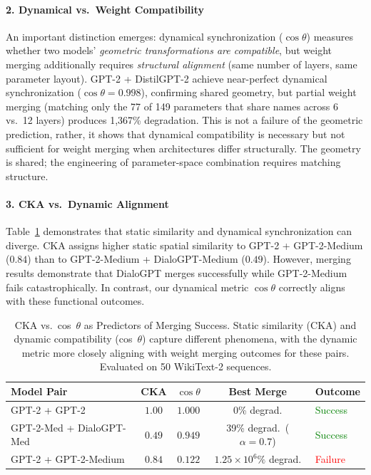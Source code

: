 \documentclass[10pt]{article} %
\theoremstyle{plain}
\theoremstyle{definition}
\theoremstyle{remark}
\begin{document}
\paragraph{2. Dynamical vs.\ Weight Compatibility}
An important distinction emerges: dynamical synchronization ($\cos \theta$) measures whether two models' \textit{geometric transformations are compatible}, but weight merging additionally requires \textit{structural alignment} (same number of layers, same parameter layout). GPT-2 + DistilGPT-2 achieve near-perfect dynamical synchronization ($\cos \theta = 0.998$), confirming shared geometry, but partial weight merging (matching only the 77 of 149 parameters that share names across 6 vs.\ 12 layers) produces 1,367\% degradation. This is not a failure of the geometric prediction, rather, it shows that dynamical compatibility is necessary but not sufficient for weight merging when architectures differ structurally. The geometry is shared; the engineering of parameter-space combination requires matching structure.

\paragraph{3. CKA vs.\ Dynamic Alignment}
Table~\ref{tab:cka_comparison} demonstrates that static similarity and dynamical synchronization can diverge. CKA assigns higher static spatial similarity to GPT-2 + GPT-2-Medium ($0.84$) than to GPT-2-Medium + DialoGPT-Medium ($0.49$). However, merging results demonstrate that DialoGPT merges successfully while GPT-2-Medium fails catastrophically. In contrast, our dynamical metric $\cos \theta$ correctly aligns with these functional outcomes.

\begin{table}[htbp]
\centering
\caption{CKA vs.~cos~$\theta$ as Predictors of Merging Success. Static similarity (CKA) and dynamic compatibility (cos~$\theta$) capture different phenomena, with the dynamic metric more closely aligning with weight merging outcomes for these pairs. Evaluated on 50 WikiText-2 sequences.}
\label{tab:cka_comparison}
\small
\begin{tabular}{l ccc l}
\toprule
\textbf{Model Pair} & \textbf{CKA} & \textbf{$\cos \theta$} & \textbf{Best Merge} & \textbf{Outcome} \\
\midrule
GPT-2 + GPT-2 & $1.00$ & $1.000$ & 0\% degrad. & \textcolor{green}{Success} \\
GPT-2-Med + DialoGPT-Med & $0.49$ & $0.949$ & 39\% degrad.~($\alpha{=}0.7$) & \textcolor{green}{Success} \\
GPT-2 + GPT-2-Medium & $\mathbf{0.84}$ & $0.122$ & $1.25{\times}10^6\%$ degrad. & \textcolor{red}{Failure} \\
\bottomrule
\end{tabular}
\end{table}
\end{document}
